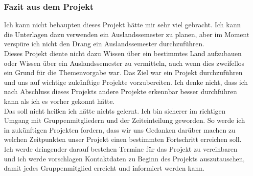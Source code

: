 \documentclass[11pt]{article}
\begin{document}
\subsubsection{Fazit aus dem Projekt}

Ich kann nicht behaupten dieses Projekt hätte mir sehr viel gebracht. Ich kann die Unterlagen dazu verwenden ein Auslandssemester zu planen, aber im Moment verspüre ich nicht den Drang ein Auslandssemester durchzuführen.  \\
Dieses Projekt diente nicht dazu Wissen über ein bestimmtes Land aufzubauen oder Wissen über ein Auslandssemester zu vermitteln, auch wenn dies zweifellos ein Grund für die Themenvorgabe war. Das Ziel war ein Projekt durchzuführen und uns auf wichtige zukünftige Projekte vorzubereiten. Ich denke nicht, dass ich nach Abschluss dieses Projekts andere Projekte erkennbar besser durchführen kann als ich es vorher gekonnt hätte.\\
Das soll nicht heißen ich hätte nichts gelernt. Ich bin sicherer im richtigen Umgang mit Gruppenmitgliedern und der Zeiteinteilung geworden. So werde ich in zukünftigen Projekten fordern, dass wir uns Gedanken darüber machen zu welchen Zeitpunkten unser Projekt einen bestimmten Fortschritt erreichen soll. Ich werde dringender darauf bestehen Termine für das Projekt zu vereinbaren und ich werde vorschlagen Kontaktdaten zu Beginn des Projekts auszutauschen, damit jedes Gruppenmitglied erreicht und informiert werden kann.
\end{document}
